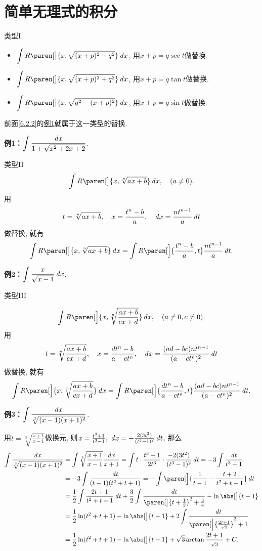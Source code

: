\documentclass[a4paper,punct=CCT]{ctexbook}
\newcommand*{\ex}[2]{\textbf{例#1：}#2}
\newcommand*{\disp}[1]{\( \displaystyle #1 \)}
\newcommand*{\exds}[2]{\ex{#1}\disp{#2}}
\theoremstyle{definition}
\theoremstyle{remark}
\begin{document}
\section{简单无理式的积分\label{6.5}}

类型I

\begin{itemize}
\item \(\displaystyle \int R\paren[\big]{x, \sqrt{(x+p)^2 - q^2}} \dx\), 用\(x + p = q \sec t\)做替换.
\item \(\displaystyle \int R\paren[\big]{x, \sqrt{(x+p)^2 + q^2}} \dx\), 用\(x + p = q \tan t\)做替换.
\item \(\displaystyle \int R\paren[\big]{x, \sqrt{q^2 - (x+p)^2}} \dx\), 用\(x + p = q \sin t\)做替换.
\end{itemize}

前面\ref{6.2.2}的\hyperlink{eg:sinsub}{例1}就属于这一类型的替换.

\exds{1}{\int \frac{\dx}{1+\sqrt{x^2+2x+2}}}.

类型II
\[
  \int R\paren[\big]{x, \sqrt[n]{ax+b}} \dx, \quad (a \ne 0).
\]
用
\[
  t = \sqrt[n]{ax+b}, \quad
  x = \frac{t^n-b}{a}, \quad
  \mathop{}\!\mathit{d} x = \frac{nt^{n-1}}{a} \mathop{}\!\mathit{d} t
\]
做替换, 就有
\[
  \int R\paren[\big]{x, \sqrt[n]{ax+b}} \dx
  = \int R\paren[\Big]{\frac{t^n-b}{a}, t} \frac{nt^{n-1}}{a} \dt.
\]

\exds{2}{\int \frac{x}{\sqrt{x-1}} \dx}.

类型III

\[
  \int R\paren[\Big]{x, \sqrt[n]{\frac{ax+b}{cx+d}}} \dx, \quad (a \ne 0, c \ne 0).
\]
用
\[
  t = \sqrt[n]{\frac{ax+b}{cx+d}}, \quad
  x = \frac{dt^n-b}{a-ct^n}, \quad
  \mathop{}\!\mathit{d} x = \frac{(ad-bc)nt^{n-1}}{(a-ct^n)^2} \mathop{}\!\mathit{d} t
\]
做替换, 就有
\[
  \int R\paren[\Big]{x, \sqrt[n]{\frac{ax+b}{cx+d}}} \dx
  = \int R\paren[\Big]{\frac{dt^n-b}{a-ct^n}, t} \frac{(ad-bc)nt^{n-1}}{(a-ct^n)^2} \dt.
\]

\hypertarget{eg:rootI}{}
\exds{3}{\int \frac{\dx}{\sqrt[3]{(x-1)(x+1)^2}}}.

用\(t = \sqrt[3]{\frac{x+1}{x-1}}\)做换元, 则\(x = \frac{t^3+1}{t^3-1},\ \mathop{}\!\mathit{d} x = -\frac{2(3t^2)}{(t^3-1)^2} \mathop{}\!\mathit{d} t\), 那么
\[
  \begin{split}
    \int \frac{\dx}{\sqrt[3]{(x-1)(x+1)^2}}
    &= \int \sqrt[3]{\frac{x+1}{x-1}} \frac{\dx}{x+1}
    = \int t \cdot \frac{t^3-1}{2t^3} \cdot \frac{-2(3t^2)}{(t^3-1)^2} \dt
    = -3 \int \frac{\dt}{t^3-1} \\
    &= -3 \int \frac{\dt}{(t-1)(t^2+t+1)}
    = - \int \paren[\Big]{\frac{1}{t-1} - \frac{t+2}{t^2+t+1}} \dt \\
    &= \frac12 \int \frac{2t+1}{t^2+t+1} \dt + \frac32 \int \frac{\dt}{\paren[\big]{t+\frac12}^2+\frac34} - \ln\abs[\big]{t-1} \\
    &= \frac12 \ln(t^2+t+1) - \ln\abs[\big]{t-1} + 2 \int \frac{\dt}{\paren[\Big]{\frac{2t+1}{\scriptscriptstyle\sqrt3}}^2 + 1} \\
    &= \frac12 \ln(t^2+t+1) - \ln\abs[\big]{t-1} + \sqrt3 \arctan \frac{2t+1}{\scriptstyle\sqrt3} + C.
  \end{split}
\]
\end{document}
